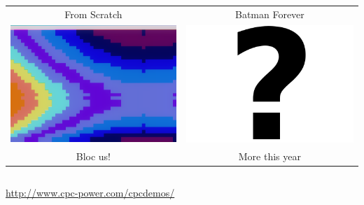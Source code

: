 \documentclass{beamer}
\begin{document}
\begin{frame}
\begin{columns}
\begin{column}{.62\linewidth}
{\begin{tabular}{@{}cc@{}}
	  From Scratch & Batman Forever \\

	  \includegraphics[width=0.45\linewidth]{imgs/demo_blocus} &
	  \includegraphics[width=0.45\linewidth]{imgs/demo_unknown}
	  \\

	  Bloc us! & More this year \\
	\end{tabular}
	}
      \end{column}
    \end{columns}
    \begin{center}
    \url{http://www.cpc-power.com/cpcdemos/}
  \end{center}
  \end{frame}




\end{document}
